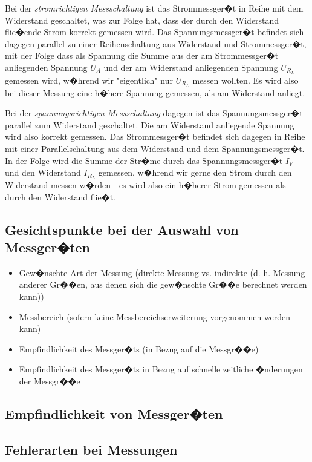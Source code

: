 \documentclass[10pt]{scrartcl}
\begin{document}
Bei der \emph{stromrichtigen Messschaltung} ist das Strommessger�t in Reihe mit dem Widerstand geschaltet, was zur Folge hat, dass der durch den Widerstand flie�ende Strom korrekt gemessen wird. Das Spannungsmessger�t befindet sich dagegen parallel zu einer Reihenschaltung aus Widerstand und Strommessger�t, mit der Folge dass als Spannung die Summe aus der am Strommessger�t anliegenden Spannung $U_A$ und der am Widerstand anliegenden Spannung $U_{R_L}$ gemessen wird, w�hrend wir "eigentlich" nur $U_{R_L}$ messen wollten. Es wird also bei dieser Messung eine h�here  Spannung gemessen, als am Widerstand anliegt.

Bei der \emph{spannungsrichtigen Messschaltung} dagegen ist das Spannungsmessger�t parallel zum Widerstand geschaltet. Die am Widerstand anliegende Spannung wird also korrekt gemessen. Das Strommessger�t befindet sich dagegen in Reihe mit einer Parallelschaltung aus dem Widerstand und dem Spannungsmessger�t. In der Folge wird die Summe der Str�me durch das Spannungsmessger�t $I_V$ und den Widerstand $I_{R_L}$ gemessen, w�hrend wir gerne den Strom durch den Widerstand messen w�rden - es wird also ein h�herer Strom gemessen als durch den Widerstand flie�t.

\subsection{Gesichtspunkte bei der Auswahl von Messger�ten}

\begin{itemize}
\item Gew�nschte Art der Messung (direkte Messung vs. indirekte (d. h. Messung anderer Gr��en, aus denen sich die gew�nschte Gr��e berechnet werden kann))
\item Messbereich (sofern keine Messbereichserweiterung vorgenommen werden kann)
\item Empfindlichkeit des Messger�ts (in Bezug auf die Messgr��e)
\item Empfindlichkeit des Messger�ts in Bezug auf schnelle zeitliche �nderungen der Messgr��e
\end{itemize}

\subsection{Empfindlichkeit von Messger�ten}

\subsection{Fehlerarten bei Messungen}
\end{document}

